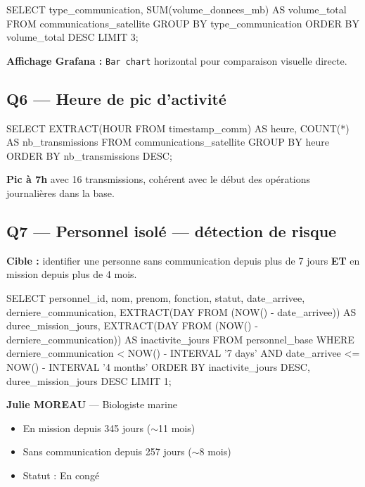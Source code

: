 \documentclass[11pt,a4paper]{article}
\begin{document}
\begin{sqlbox}
SELECT type_communication, SUM(volume_donnees_mb) AS volume_total
FROM communications_satellite
GROUP BY type_communication
ORDER BY volume_total DESC
LIMIT 3;
\end{sqlbox}

\textbf{Affichage Grafana :} \texttt{Bar chart} horizontal pour comparaison visuelle directe.

\subsection{Q6 — Heure de pic d'activité}

\begin{sqlbox}
SELECT EXTRACT(HOUR FROM timestamp_comm) AS heure,
       COUNT(*) AS nb_transmissions
FROM communications_satellite
GROUP BY heure
ORDER BY nb_transmissions DESC;
\end{sqlbox}

\begin{resultbox}[title={\faClock~Résultat}]
\textbf{Pic à 7h} avec 16 transmissions, cohérent avec le début des opérations journalières dans la base.
\end{resultbox}

\subsection{Q7 — Personnel isolé — détection de risque}

\textbf{Cible :} identifier une personne sans communication depuis plus de 7 jours \textbf{ET} en mission depuis plus de 4 mois.

\begin{sqlbox}
SELECT personnel_id, nom, prenom, fonction, statut,
       date_arrivee, derniere_communication,
       EXTRACT(DAY FROM (NOW() - date_arrivee))           AS duree_mission_jours,
       EXTRACT(DAY FROM (NOW() - derniere_communication)) AS inactivite_jours
FROM personnel_base
WHERE derniere_communication < NOW() - INTERVAL '7 days'
  AND date_arrivee <= NOW() - INTERVAL '4 months'
ORDER BY inactivite_jours DESC, duree_mission_jours DESC
LIMIT 1;
\end{sqlbox}

\begin{resultbox}[title={\faExclamationTriangle~Cas critique identifié}]
\textbf{Julie MOREAU} — Biologiste marine
\begin{itemize}
  \item En mission depuis 345 jours (\(\sim\)11 mois)
  \item Sans communication depuis 257 jours (\(\sim\)8 mois)
  \item Statut : En congé
\end{itemize}
\end{resultbox}
\end{document}
